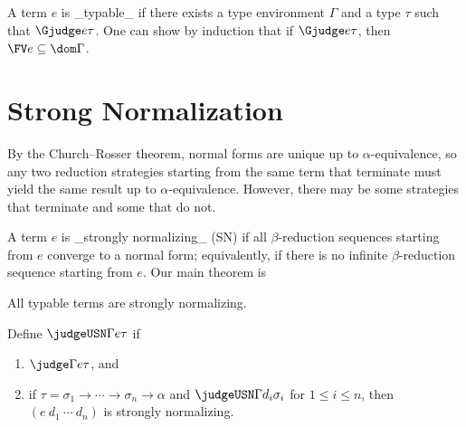 A term $e$ is _typable_ if there exists a type environment $\Gamma$ and a type $\tau$ such that $\Gjudge e\tau$. One can show by induction that if $\Gjudge e\tau$, then $\FV e\subseteq\dom\Gamma$.

\section{Strong Normalization}

By the Church--Rosser theorem, normal forms are unique up to $\alpha$-equivalence, so any two reduction strategies starting from the same term that terminate must yield the same result up to $\alpha$-equivalence. However, there may be some strategies that terminate and some that do not.

A term $e$ is _strongly normalizing_ (SN) if all $\beta$-reduction sequences starting from $e$ converge to a normal form; equivalently, if there is no infinite $\beta$-reduction sequence starting from $e$. Our main theorem is

\begin{theorem}
\label{thm:SN}
All typable terms are strongly normalizing.
\end{theorem}




\begin{definition}
\label{def:USN}
Define $\judgeUSN\Gamma e\tau$ if
\begin{enumerate}
\renewcommand\labelenumi{\upshape(\Alph{enumi})}
\item
$\judge\Gamma e\tau$, and
\item
if $\tau=\sigma_1\to\cdots\to\sigma_n\to\alpha$ and $\judgeUSN\Gamma{d_i}{\sigma_i}$ for $1\leq i\leq n$, then $(e~d_1~\cdots~d_n)$ is strongly normalizing.
\end{enumerate}
\end{definition}


